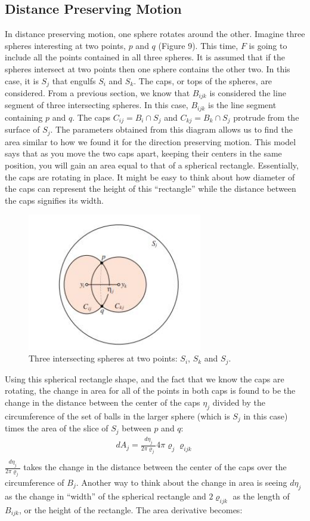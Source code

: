 \documentclass{article}
\begin{document}
\subsection{Distance Preserving Motion}
In distance preserving motion, one sphere rotates around the other. Imagine three spheres interesting at two points, $p$ and $q$ (Figure 9). This time, $F$ is going to include all the points contained in all three spheres. It is assumed that if the spheres intersect at two points then one sphere contains the other two. In this case, it is $S_j$ that engulfs $S_i$ and $S_k$. The caps, or tops of the spheres, are considered. From a previous section, we know that $B_{ijk}$ is considered the line segment of three intersecting spheres. In this case, $B_{ijk}$ is the line segment containing $p$ and $q$. The caps $C_{ij} = B_i \cap S_j$ and $C_{kj} = B_k \cap S_j$ protrude from the surface of $S_j$. The parameters obtained from this diagram allows us to find the area similar to how we found it for the direction preserving motion. This model says that as you move the two caps apart, keeping their centers in the same position, you will gain an area equal to that of a spherical rectangle. Essentially, the caps are rotating in place. It might be easy to think about how diameter of the caps can represent the height of this “rectangle” while the distance between the caps signifies its width.
\begin{figure}[h!]
\caption{Three intersecting spheres at two points: $S_i$, $S_k$ and $S_j$.\cite{Bryant}}
\centerline{\includegraphics[width=3in]{Figure7}}
\end{figure}

Using this spherical rectangle shape, and the fact that we know the caps are rotating, the change in area for all of the points in both caps is found to be the change in the distance between the center of the caps $\eta_j$ divided by the circumference of the set of balls in the larger sphere (which is $S_j$ in this case) times the area of the slice of $S_j$ between $p$ and $q$: 
\begin{align*}
dA_j = \frac{d\eta_j}{2\pi\varrho_j}4\pi\varrho_j\varrho_{ijk}\\
\end{align*}
$\frac{d\eta_j}{2\pi\varrho_j}$ takes the change in the distance between the center of the caps over the circumference of $B_j$. Another way to think about the change in area is seeing $d\eta_j$ as the change in “width” of the spherical rectangle and $2\varrho_{ijk}$ as the length of $B_{ijk}$, or the height of the rectangle. The area derivative becomes:
\end{document}

